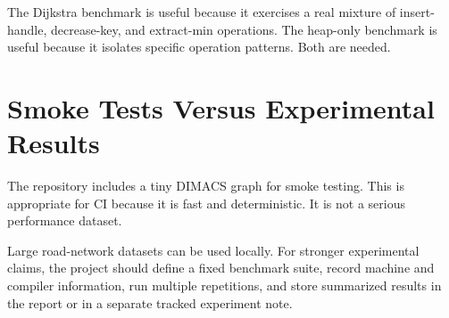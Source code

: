 The Dijkstra benchmark is useful because it exercises a real mixture of insert-handle, decrease-key, and extract-min operations.
The heap-only benchmark is useful because it isolates specific operation patterns.
Both are needed.

\section{Smoke Tests Versus Experimental Results}

The repository includes a tiny DIMACS graph for smoke testing.
This is appropriate for CI because it is fast and deterministic.
It is not a serious performance dataset.

Large road-network datasets can be used locally.
For stronger experimental claims, the project should define a fixed benchmark suite, record machine and compiler information, run multiple repetitions, and store summarized results in the report or in a separate tracked experiment note.
